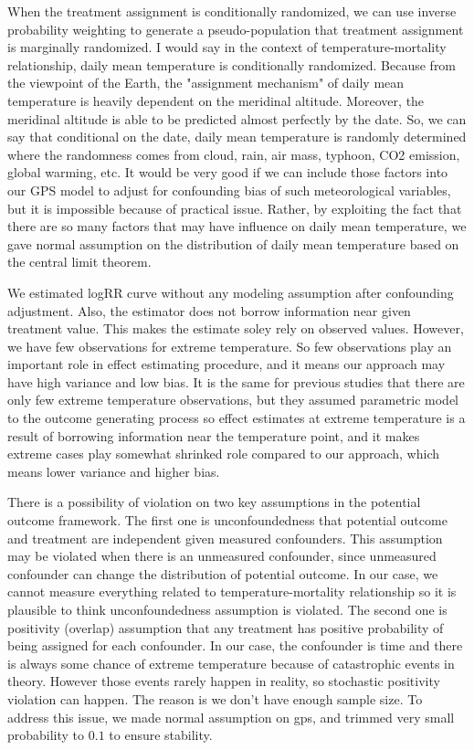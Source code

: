 \documentclass[12pt]{article}
\begin{document}
When the treatment assignment is conditionally randomized, 
we can use inverse probability weighting to generate a pseudo-population
that treatment assignment is marginally randomized.
I would say in the context of temperature-mortality relationship,
daily mean temperature is conditionally randomized.
Because from the viewpoint of the Earth, 
the "assignment mechanism" of daily mean temperature is heavily dependent on the meridinal altitude.
Moreover, the meridinal altitude is able to be predicted almost perfectly by the date.
So, we can say that conditional on the date, daily mean temperature is randomly determined
where the randomness comes from cloud, rain, air mass, typhoon, CO2 emission, global warming, etc.
It would be very good if we can include those factors into our GPS model 
to adjust for confounding bias of such meteorological variables,
but it is impossible because of practical issue.
Rather, by exploiting the fact that 
there are so many factors that may have influence on daily mean temperature,
we gave normal assumption on the distribution of daily mean temperature 
based on the central limit theorem.

We estimated logRR curve without any modeling assumption after confounding adjustment.
Also, the estimator does not borrow information near given treatment value.
This makes the estimate soley rely on observed values.
However, we have few observations for extreme temperature.
So few observations play an important role in effect estimating procedure,
and it means our approach may have high variance and low bias.
It is the same for previous studies that there are only few extreme temperature observations,
but they assumed parametric model to the outcome generating process
so effect estimates at extreme temperature is a result of borrowing information near the temperature point,
and it makes extreme cases play somewhat shrinked role compared to our approach,
which means lower variance and higher bias.

There is a possibility of violation on two key assumptions in the potential outcome framework.
The first one is unconfoundedness
that potential outcome and treatment are independent given measured confounders.
This assumption may be violated when there is an unmeasured confounder,
since unmeasured confounder can change the distribution of potential outcome.
In our case, we cannot measure everything related to temperature-mortality relationship
so it is plausible to think unconfoundedness assumption is violated.
The second one is positivity (overlap) assumption
that any treatment has positive probability of being assigned for each confounder.
In our case, the confounder is time and 
there is always some chance of extreme temperature because of catastrophic events in theory.
However those events rarely happen in reality, 
so stochastic positivity violation\cite{zivich2022} can happen.
The reason is we don't have enough sample size.
To address this issue, we made normal assumption on gps,
and trimmed very small probability to $0.1$ to ensure stability.

{}

\end{document}
